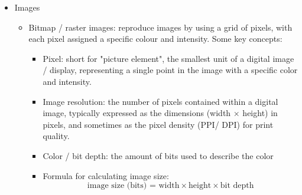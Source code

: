 \documentclass[a4paper,12pt]{article}
\begin{document}
\begin{itemize}
\begin{itemize}
\begin{itemize}
   \item $11110000$: 1111 means 4 bytes is needed to transmit the character, the 0 coming right after the 4 1s means the end of transmitting the number of bytes. The 3 0s afterwards are the data transmitted.
   \item $10......$: 10 means the continuation bytes being sent, the numbers afterwards are transmitted data.
   \item 0001 1111 0110 0000 0100 are the final data received.
   \end{itemize}
\item UTF-8 has been adopted by the internet as the main character encoding system. Some problems:
\begin{itemize}
    \item Due to the variable length, some characterstake more space compared to single-byte encodings. 
    \item ... This can lead to larger file sizes in certain contexts.
    \item The processing required to handle variable length encoding also requires more complex \\ processing compared to fixed-length 
systems such as UTF-32. 
    \end{itemize}
    \end{itemize}
    \item Images
    \begin{itemize}
        \item Bitmap / raster images: reproduce images by using a grid of pixels, with each pixel assigned a specific colour and intensity. Some key concepts:
        \begin{itemize}
            \item Pixel: short for "picture element", the smallest unit of a digital image / display, representing a single point in the image with a specific color and intensity.
            \item Image resolution: the number of pixels contained within a digital image, typically expressed as the dimensions (width $\times$ height) in pixels, and sometimes as the pixel density (PPI/ DPI) for print quality. 
            \item Color / bit depth: the amount of bits used to describe the color
            \item Formula for calculating image size:
            \[\text{image size (bits) = width}\times \text{height} \times \text{bit depth}\]

\end{itemize}
\end{itemize}
\end{itemize}
\end{document}
